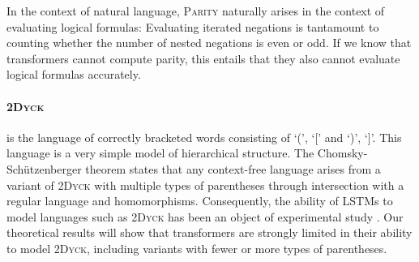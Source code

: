 \documentclass[11pt,a4paper]{article}
\newcounter{theorem}
\begin{document}
In the context of natural language, \textsc{Parity} naturally arises in the context of evaluating logical formulas:
Evaluating iterated negations is tantamount to counting whether the number of nested negations is even or odd.
If we know that transformers cannot compute parity, this entails that they also cannot evaluate logical formulas accurately.









%
%


\paragraph{\textsc{2Dyck}} is the language of correctly bracketed words consisting of `(', `[' and `)', `]'.
This language is a very simple model of hierarchical structure.
The Chomsky-Sch{\"u}tzenberger theorem \cite{chomsky1963algebraic} states that any context-free language arises from a variant of \textsc{2Dyck} with multiple types of parentheses through intersection with a regular language and homomorphisms.
Consequently, the ability of LSTMs to model languages such as \textsc{2Dyck} has been an object of experimental study \cite{sennhauser2018evaluating,skachkova2018closing,bernardy2018can}.
Our theoretical results will show that transformers are strongly limited in their ability to model \textsc{2Dyck}, including variants with fewer or more types of parentheses.
\end{document}
